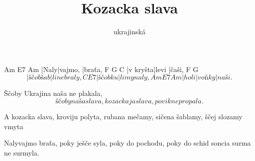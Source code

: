 \documentclass{song}
\title{Kozacka slava}
\author{ukrajinská}
\begin{document}
\strophe
Am   E7      Am
|Naly|vajmo, |braťa,
F        G     C
|v kryšta|levi |čaši,
   F        G
\[ |ščob šab|li ne braly,
C       E7
|ščob ku|li mynaly,
Am   E7     Am
|holi|voňky |naši. \]
\endstrophe

\strophe*
Ščoby Ukrajina
naša ne plakala,
\[ ščoby naša slava,
kozackaja slava,
povik ne propala.\]
\endstrophe

\strophe*
A kozacka slava,
kroviju polyta,
rubana mečamy,
sičena šablamy,
ščej slozamy vmyta
\endstrophe

\strophe*
Nalyvajmo braťa,
poky ješče syla,
poky do pochodu,
poky do schid soncia
surma ne surmyla.
\endstrophe
\end{document}
